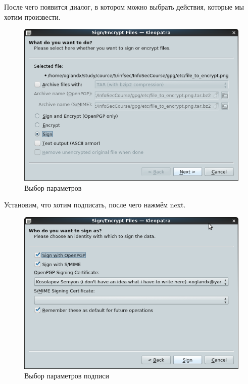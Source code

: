 \documentclass[a4paper]{article}
\begin{document}
После чего появится диалог, в котором можно выбрать действия, которые мы хотим произвести. 

\begin{figure}[H]
	\begin{center}
		\includegraphics[scale=0.5]{pics/sign.png}
		\caption{Выбор параметров} 
		\label{pic:pic_name} %
	\end{center}
\end{figure}

Установим, что хотим подписать, после чего нажмём next.

\begin{figure}[H]
	\begin{center}
		\includegraphics[scale=0.5]{pics/sign_signing.png}
		\caption{Выбор параметров подписи} 
		\label{pic:pic_name} %
	\end{center}
\end{figure}
\end{document}
